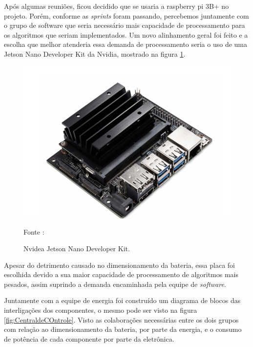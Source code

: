 \par Após algumas reuniões, ficou decidido que se usaria a raspberry pi 3B+ no projeto. Porém, conforme as  \textit{sprints} foram passando, percebemos juntamente com o grupo de software que seria necessário mais capacidade de processamento para os algoritmos que seriam implementados. Um novo alinhamento geral foi feito e a escolha que melhor atenderia essa demanda de processamento seria o uso de uma Jetson Nano Developer Kit da Nvidia, mostrado na figura \ref{fig:Nvidea}. 

\begin{figure}[H]
  \centering
  \includegraphics[scale=0.5]{figuras/NvideaPI2.png}
  \caption{Nvidea Jetson Nano Developer Kit. } 
  {\footnotesize Fonte : \cite{Nvidia_Nano} } 
  \label{fig:Nvidea}
\end{figure}

\par Apesar do detrimento causado no dimensionamento da bateria, essa placa foi escolhida devido a sua maior  capacidade de processamento de algoritmos mais pesados, assim suprindo a demanda encaminhada pela equipe de \textit{software}.

\par Juntamente com a equipe de energia foi construído um diagrama de blocos das interligações dos componentes, o mesmo pode ser visto  na figura \ref{fig:CentraldeCOntrole}. Visto as colaborações necessárias entre os dois grupos com relação ao dimensionamento da bateria, por parte da energia, e o consumo de potência de cada componente por parte da eletrônica. 



